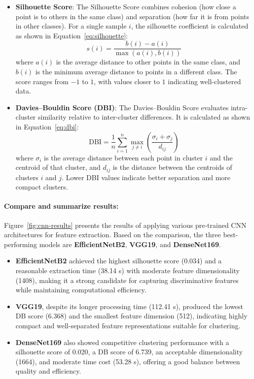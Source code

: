 \begin{itemize}
    \item \textbf{Silhouette Score}:  
    The Silhouette Score combines cohesion (how close a point is to others in the same class) and separation (how far it is from points in other classes). For a single sample $i$, the silhouette coefficient is calculated as shown in Equation~\ref{eq:silhouette}:
    \begin{equation}
        s(i) = \frac{b(i) - a(i)}{\max(a(i), b(i))}
        \label{eq:silhouette}
    \end{equation}
    where $a(i)$ is the average distance to other points in the same class, and $b(i)$ is the minimum average distance to points in a different class. The score ranges from $-1$ to $1$, with values closer to $1$ indicating well-clustered data.

    \item \textbf{Davies–Bouldin Score (DBI)}:  
    The Davies–Bouldin Score evaluates intra-cluster similarity relative to inter-cluster differences. It is calculated as shown in Equation~\ref{eq:dbi}:
    \begin{equation}
        \text{DBI} = \frac{1}{n} \sum_{i=1}^{n} \max_{j \neq i} \left( \frac{\sigma_i + \sigma_j}{d_{ij}} \right)
        \label{eq:dbi}
    \end{equation}
    where $\sigma_i$ is the average distance between each point in cluster $i$ and the centroid of that cluster, and $d_{ij}$ is the distance between the centroids of clusters $i$ and $j$. Lower DBI values indicate better separation and more compact clusters.
\end{itemize}


\paragraph{Compare and summarize results:}  
Figure~\ref{fig:cnn-results} presents the results of applying various pre-trained CNN architectures for feature extraction. Based on the comparison, the three best-performing models are \textbf{EfficientNetB2}, \textbf{VGG19}, and \textbf{DenseNet169}.

\begin{itemize}
    \item \textbf{EfficientNetB2} achieved the highest silhouette score (0.034) and a reasonable extraction time (38.14 s) with moderate feature dimensionality (1408), making it a strong candidate for capturing discriminative features while maintaining computational efficiency.

    \item \textbf{VGG19}, despite its longer processing time (112.41 s), produced the lowest DB score (6.368) and the smallest feature dimension (512), indicating highly compact and well-separated feature representations suitable for clustering.

    \item \textbf{DenseNet169} also showed competitive clustering performance with a silhouette score of 0.020, a DB score of 6.739, an acceptable dimensionality (1664), and moderate time cost (53.28 s), offering a good balance between quality and efficiency.
\end{itemize}

